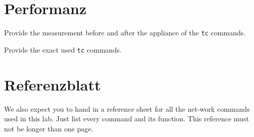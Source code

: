 \documentclass[11pt,titlepage]{article}
\newenvironment{shadedquotation}
 {\begin{shaded*}
  \quoting[leftmargin=0pt, vskip=0pt]
 }
 {\endquoting
 \end{shaded*}
}
\begin{document}
\section{Performanz}
\label{sec:Performanz}
\begin{shadedquotation}
  Provide the measurement before and after the appliance of the \lstinline!tc! commands.
  
  Provide the exact used \lstinline!tc! commands.
\end{shadedquotation}

\section{Referenzblatt}
\label{sec:Referenzblatt}
\begin{shadedquotation}
  We also expect you to hand in a reference sheet for all the net-work commands used in this lab. Just list every command and its function. This reference must not be longer than one page.
\end{shadedquotation}

\par\medskip 
\end{document}
